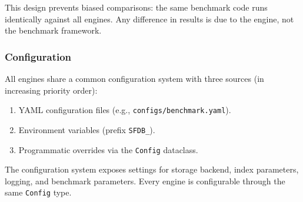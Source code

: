 This design prevents biased comparisons: the same benchmark code runs
identically against all engines.  Any difference in results is due to
the engine, not the benchmark framework.

\subsubsection{Configuration}

All engines share a common configuration system with three sources
(in increasing priority order):

\begin{enumerate}
    \item YAML configuration files (e.g., \texttt{configs/benchmark.yaml}).
    \item Environment variables (prefix \texttt{SFDB\_}).
    \item Programmatic overrides via the \texttt{Config} dataclass.
\end{enumerate}

The configuration system exposes settings for storage backend, index
parameters, logging, and benchmark parameters.  Every engine is
configurable through the same \texttt{Config} type.
